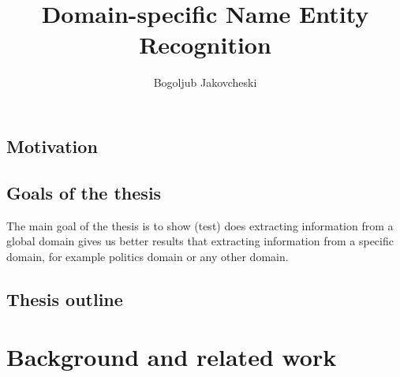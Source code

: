 \documentclass[thesis=M,english]{FITthesis}[2018/05/30]
\title{Domain-specific Name Entity Recognition}
\author{Bogoljub Jakovcheski} %
\begin{document}

\begin{introduction}

\section{Motivation}

\section{Goals of the thesis}
	The main goal of the thesis is to show (test) does extracting information from a 	global domain gives us better results that extracting information from a specific domain, for example politics domain or any other domain.
\section{Thesis outline}
	
\end{introduction}

\chapter{Background and related work}\label{textcompr}

	
\end{document}
